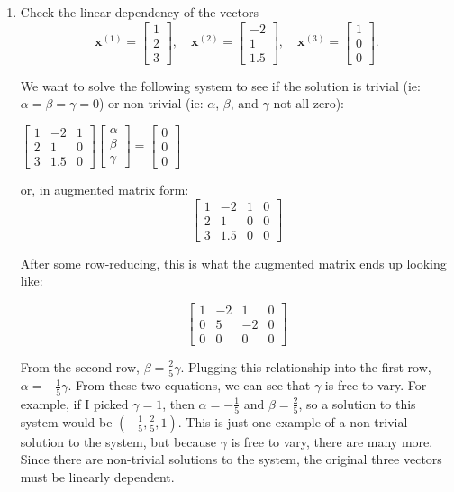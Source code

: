 \documentclass[11pt]{amsart}
\theoremstyle{plain}
\theoremstyle{definition}
\newcommand{\vect}[1]{\mathbf{#1}}
\begin{document}
\begin{enumerate}
\item Check the linear dependency of the vectors
\[
\vect{x}^{(1)}=\begin{bmatrix}1\\
2\\
3
\end{bmatrix},\quad\vect{x}^{(2)}=\begin{bmatrix}-2\\
1\\
1.5
\end{bmatrix},\quad\vect{x}^{(3)}=\begin{bmatrix}1\\
0\\
0
\end{bmatrix}.
\]

We want to solve the following system to see if the solution is trivial (ie: $\alpha = \beta = \gamma = 0$) or non-trivial (ie: $\alpha$, $\beta$, and $\gamma$ not all zero):

\begin{center}
$
\begin{bmatrix}
	1 & -2 & 1 \\
	2 & 1 & 0 \\
	3 & 1.5 & 0
\end{bmatrix}
\begin{bmatrix}
	\alpha \\
	\beta \\
	\gamma
\end{bmatrix}
=
\begin{bmatrix}
	0  \\
	0  \\
 	0
\end{bmatrix}
$
\end{center}

or, in augmented matrix form:
$$
\left[\begin{array}{rrr|r}
1 & -2 & 1 & 0 \\
2 & 1 & 0 & 0 \\
3 & 1.5 & 0 & 0
\end{array}\right]
$$ 

After some row-reducing, this is what the augmented matrix ends up looking like:

$$
\left[\begin{array}{rrr|r}
1 & -2 & 1 & 0 \\
0 & 5 & -2 & 0 \\
0 & 0 & 0 & 0
\end{array}\right]
$$ 

From the second row, $\beta = \frac{2}{5} \gamma$. Plugging this relationship into the first row, $\alpha = -\frac{1}{5} \gamma$. From these two equations, we can see that $\gamma$ is free to vary. For example, if I picked $\gamma = 1$, then $\alpha = -\frac{1}{5}$ and $\beta = \frac{2}{5}$, so a solution to this system would be $(-\frac{1}{5}, \frac{2}{5}, 1)$. This is just one example of a non-trivial solution to the system, but because $\gamma$ is free to vary, there are many more. Since there are non-trivial solutions to the system, the original three vectors must be linearly dependent. 


\end{enumerate}
\end{document}
